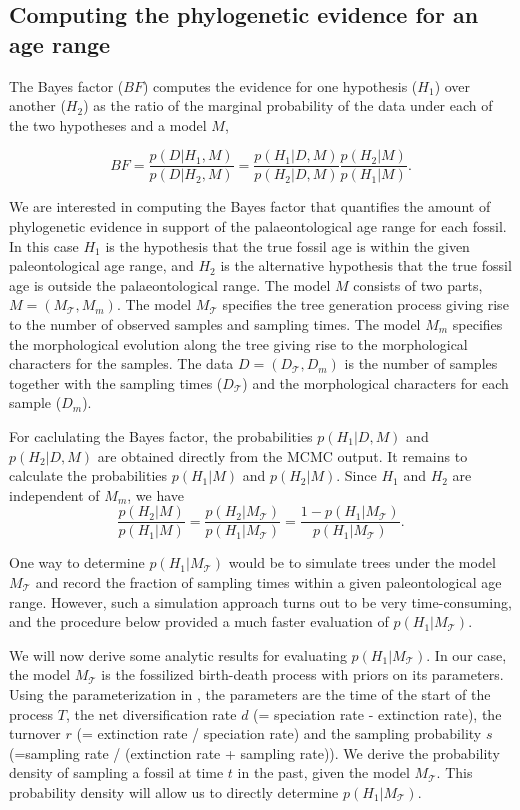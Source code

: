 \documentclass[11pt]{article}
\begin{document}
\subsection*{Computing the phylogenetic evidence for an age range}

The Bayes factor ($BF$) computes the evidence for one hypothesis ($H_1$) over another ($H_2$) as the ratio of the marginal probability of the data under each of the two hypotheses and a model $M$, 

\begin{equation}
BF = \frac{p(D|H_1,M)}{p(D|H_2,M)} = \frac{p(H_1|D,M)}{p(H_2|D,M)}\frac{p(H_2|M)}{p(H_1|M)}.
\end{equation}

We are interested in computing the Bayes factor that quantifies the amount of phylogenetic evidence in support of the palaeontological age range for each fossil. In this case $H_1$ is the hypothesis that the true fossil age is within the given paleontological age range, and $H_2$ is the alternative hypothesis that the true fossil age is outside the palaeontological range. 
The model $M$ consists of two parts, $M=(M_\mathcal{T},M_m)$. The model $M_\mathcal{T}$ specifies the tree generation process  giving rise to the number of observed samples and sampling times. The model $M_m$ specifies the morphological evolution along the tree giving rise to the morphological characters for the samples. The data $D=(D_\mathcal{T},D_m)$ is the number of samples together with the sampling times ($D_\mathcal{T}$) and  the morphological characters for each sample ($D_m$). 


For caclulating the Bayes factor, the probabilities $p(H_1|D,M)$ and $p(H_2|D,M)$ are obtained directly from the MCMC output.
It remains to calculate the probabilities $p(H_1|M)$ and $p(H_2|M)$.
Since $H_1$ and $H_2$ are independent of $M_m$, we have $$\frac{p(H_2|M)}{p(H_1|M)}=\frac{p(H_2|M_\mathcal{T})}{p(H_1|M_\mathcal{T})}=\frac{1-p(H_1|M_\mathcal{T})}{p(H_1|M_\mathcal{T})}.$$

One way to determine $p(H_1|M_\mathcal{T})$ would be to simulate trees under the model $M_\mathcal{T}$ and record the fraction of sampling times  within a given  paleontological age range. However, such a simulation approach turns out to be very time-consuming, and the procedure below provided a much faster evaluation of $p(H_1|M_\mathcal{T})$.

We  will now derive some analytic results for evaluating $p(H_1|M_\mathcal{T})$. In our case, the model $M_\mathcal{T}$ is the fossilized birth-death process with priors on its parameters. Using the parameterization in \cite{gavryushkina2015bayesian}, the parameters are the time of the start of the process $T$, the net diversification rate $d$ (= speciation rate - extinction rate), the turnover $r$ (= extinction rate / speciation rate) and the sampling probability $s$ (=sampling rate / (extinction rate + sampling rate)).
We derive the probability density of sampling a fossil at time $t$ in the past, given the model $M_\mathcal{T}$. This probability density will allow us to directly determine $p(H_1|M_\mathcal{T})$.
\end{document}
